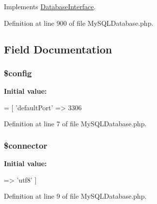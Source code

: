 Implements \hyperlink{interface_database_interface_ae7cdaa744d52a1eb0103e377023ca528}{Database\+Interface}.



Definition at line 900 of file My\+S\+Q\+L\+Database.\+php.



\subsection{Field Documentation}
\hypertarget{class_my_s_q_l_database_a49c7011be9c979d9174c52a8b83e5d8e}{}
\subsubsection[{\$config}]{\setlength{\rightskip}{0pt plus 5cm}\$config\hspace{0.3cm}{\ttfamily [protected]}}\label{class_my_s_q_l_database_a49c7011be9c979d9174c52a8b83e5d8e}
{\bfseries Initial value\+:}
\begin{DoxyCode}
= [
        \textcolor{stringliteral}{'defaultPort'} => 3306
\end{DoxyCode}


Definition at line 7 of file My\+S\+Q\+L\+Database.\+php.

\hypertarget{class_my_s_q_l_database_a7c7a1968b87fd4d016e364b27b7a3d7d}{}
\subsubsection[{\$connector}]{\setlength{\rightskip}{0pt plus 5cm}\$connector\hspace{0.3cm}{\ttfamily [protected]}}\label{class_my_s_q_l_database_a7c7a1968b87fd4d016e364b27b7a3d7d}
{\bfseries Initial value\+:}
\begin{DoxyCode}
=> \textcolor{stringliteral}{'utf8'}
    ]
\end{DoxyCode}


Definition at line 9 of file My\+S\+Q\+L\+Database.\+php.

\hypertarget{class_my_s_q_l_database_aee271b7ce67fbe00b9976e6c347cbfbf}{}
